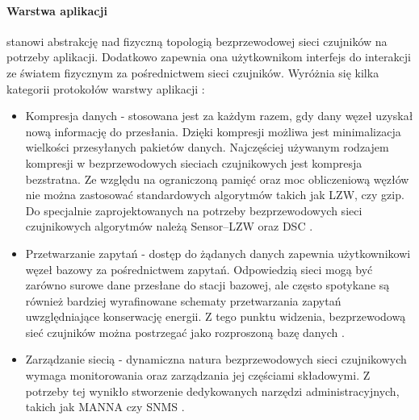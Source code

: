 \paragraph{Warstwa aplikacji}
stanowi abstrakcję nad fizyczną topologią bezprzewodowej sieci czujników na potrzeby aplikacji. Dodatkowo zapewnia ona użytkownikom interfejs do interakcji ze światem fizycznym za pośrednictwem sieci czujników. Wyróżnia się kilka kategorii protokołów warstwy aplikacji \cite{Akyildiz2010}:
\begin{itemize}
\item Kompresja danych - stosowana jest za każdym razem, gdy dany węzeł uzyskał nową informację do przesłania. Dzięki kompresji możliwa jest minimalizacja wielkości przesyłanych pakietów danych. Najczęściej używanym rodzajem kompresji w bezprzewodowych sieciach czujnikowych jest kompresja bezstratna. Ze względu na ograniczoną pamięć oraz moc obliczeniową węzłów nie można zastosować standardowych algorytmów takich jak LZW, czy gzip. Do specjalnie zaprojektowanych na potrzeby bezprzewodowych sieci czujnikowych algorytmów należą Sensor–LZW \cite{Sadler2006} oraz DSC \cite{Slepian1973, Wyner1976}.
\item Przetwarzanie zapytań - dostęp do żądanych danych zapewnia użytkownikowi węzeł bazowy za pośrednictwem zapytań. Odpowiedzią sieci mogą być zarówno surowe dane przesłane do stacji bazowej, ale często spotykane są również bardziej wyrafinowane schematy przetwarzania zapytań uwzględniające konserwację energii. Z tego punktu widzenia, bezprzewodową sieć czujników można postrzegać jako rozproszoną bazę danych \cite{Madden2002}.
\item Zarządzanie siecią - dynamiczna natura bezprzewodowych sieci czujnikowych wymaga monitorowania oraz zarządzania jej częściami składowymi. Z potrzeby tej wynikło stworzenie dedykowanych narzędzi administracyjnych, takich jak MANNA \cite{Ruiz2003} czy SNMS \cite{Tolle2005}.
\end{itemize}

